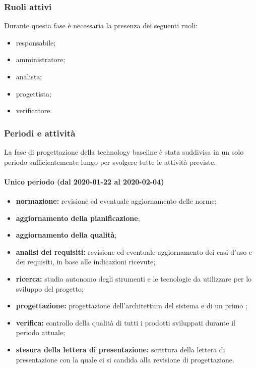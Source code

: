 			\subsubsection{Ruoli attivi}
			
				Durante questa fase è necessaria la presenza dei seguenti ruoli:
				\begin{itemize}
					\item responsabile;
					\item amministratore;
					\item analista;
					\item progettista;
					\item verificatore.
				\end{itemize}
			
			\subsubsection{Periodi e attività}
			
				La fase di progettazione della technology baseline è stata suddivisa in un solo periodo sufficientemente lungo per svolgere tutte le attività previste.
				
				\paragraph{Unico periodo (dal 2020-01-22 al 2020-02-04)}
				
					\begin{itemize}
					 	\item \textbf{normazione:} revisione ed eventuale aggiornamento delle norme;
					 	\item \textbf{aggiornamento della pianificazione};
					 	\item \textbf{aggiornamento della qualità};
					 	\item \textbf{analisi dei requisiti:} revisione ed eventuale aggiornamento dei casi d'uso e dei requisiti, in base alle indicazioni ricevute;
					 	\item \textbf{ricerca:} studio autonomo degli strumenti e le tecnologie da utilizzare per lo sviluppo del progetto;
					 	\item \textbf{progettazione:} progettazione dell'architettura del sistema e di un primo ;
					 	\item \textbf{verifica:} controllo della qualità di tutti i prodotti sviluppati durante il periodo attuale;
					 	\item \textbf{stesura della lettera di presentazione:} scrittura della lettera di presentazione con la quale ci si candida alla revisione di progettazione.
					\end{itemize} 	
		
